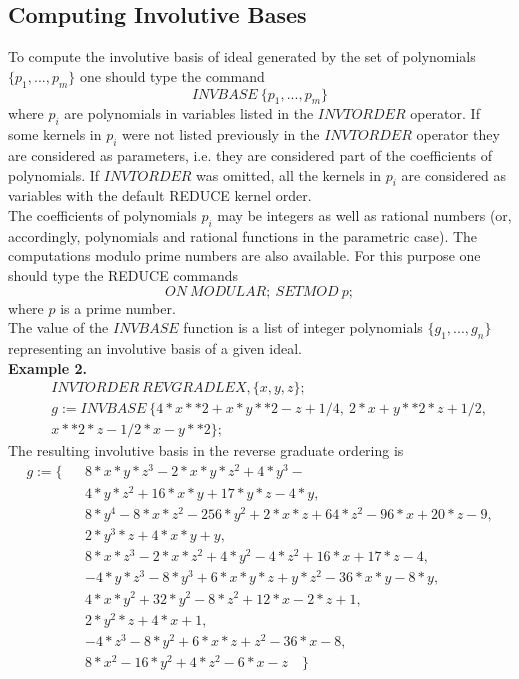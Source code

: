 \subsection{Computing Involutive Bases}
To compute the involutive basis of ideal generated by the set of
polynomials $\{p_1,...,p_m\}$ one should type the command
$$ INVBASE \> \{p_1,...,p_m\} $$
where $p_i$ are polynomials in variables listed in the
$INVTORDER$ operator. If some kernels in $p_i$ were not listed
previously in the $INVTORDER$ operator they are considered as
parameters, i.e. they are considered part of the coefficients of
polynomials. If $INVTORDER$ was omitted, all the kernels
in $p_i$ are considered as variables with the default REDUCE
kernel order.\\
The coefficients of polynomials $p_i$ may be integers as well as
rational numbers (or, accordingly, polynomials and rational functions
in the parametric case). The computations modulo prime numbers are
also available. For this purpose one should type the REDUCE commands
$$ ON \> MODULAR;\> SETMOD \> p; $$
where $p$ is a prime number.\\
The value of the $INVBASE$ function is a list of integer polynomials
$\{g_1,...,g_n\}$ representing an involutive basis of a given ideal.\\
\newpage
\noindent
{\bf Example 2.}
\begin{eqnarray*}
& & INVTORDER \> REVGRADLEX,\{x,y,z\}; \\
& & g:= INVBASE \> \{4*x**2 + x*y**2 - z + 1/4,\>
                     2*x + y**2*z + 1/2,\> \\
& &    x**2*z - 1/2*x - y**2 \};
\end{eqnarray*}
The resulting involutive basis in the reverse graduate ordering is
\begin{eqnarray*}
g := \{& & 8*x*y*z^3  - 2*x*y*z^2  + 4*y^3  - \\
& &  4*y*z^2 + 16*x*y + 17*y*z - 4*y,\\
& &  8*y^4  - 8*x*z^2  - 256*y^2  + 2*x*z + 64*z^2  - 96*x + 20*z - 9,\\
& &  2*y^3*z + 4*x*y + y,\\
& &  8*x*z^3  - 2*x*z^2  + 4*y^2  - 4*z^2 + 16*x + 17*z - 4,\\
& & - 4*y*z^3  - 8*y^3  + 6*x*y*z + y*z^2  - 36*x*y - 8*y,\\
& &  4*x*y^2  + 32*y^2  - 8*z^2  + 12*x - 2*z + 1,\\
& &  2*y^2*z + 4*x + 1,\\
& & - 4*z^3  - 8*y^2  + 6*x*z + z^2  - 36*x - 8,\\
& &  8*x^2  - 16*y^2  + 4*z^2  - 6*x - z \quad \}
\end{eqnarray*}
